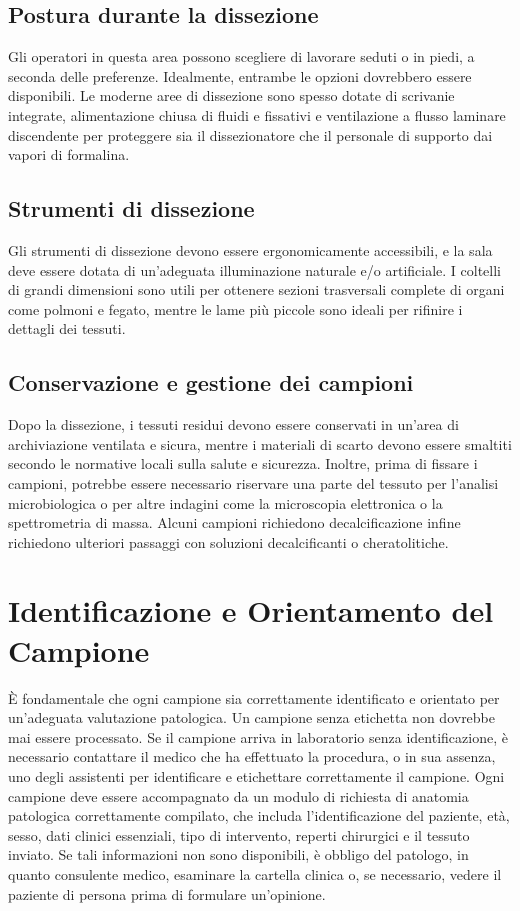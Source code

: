 \subsection{Postura durante la dissezione}
Gli operatori in questa area possono scegliere di lavorare seduti o in piedi, a seconda delle preferenze. Idealmente, entrambe le opzioni dovrebbero essere disponibili. Le moderne aree di dissezione sono spesso dotate di scrivanie integrate, alimentazione chiusa di fluidi e fissativi e ventilazione a flusso laminare discendente per proteggere sia il dissezionatore che il personale di supporto dai vapori di formalina.

\subsection{Strumenti di dissezione}
Gli strumenti di dissezione devono essere ergonomicamente accessibili, e la sala deve essere dotata di un'adeguata illuminazione naturale e/o artificiale. I coltelli di grandi dimensioni sono utili per ottenere sezioni trasversali complete di organi come polmoni e fegato, mentre le lame più piccole sono ideali per rifinire i dettagli dei tessuti.

\subsection{Conservazione e gestione dei campioni}
Dopo la dissezione, i tessuti residui devono essere conservati in un'area di archiviazione ventilata e sicura, mentre i materiali di scarto devono essere smaltiti secondo le normative locali sulla salute e sicurezza. Inoltre, prima di fissare i campioni, potrebbe essere necessario riservare una parte del tessuto per l'analisi microbiologica o per altre indagini come la microscopia elettronica o la spettrometria di massa. Alcuni campioni richiedono decalcificazione infine richiedono ulteriori passaggi con soluzioni decalcificanti o cheratolitiche.

\section{Identificazione e Orientamento del Campione}
È fondamentale che ogni campione sia correttamente identificato e orientato per un'adeguata valutazione patologica. Un campione senza etichetta non dovrebbe mai essere processato. Se il campione arriva in laboratorio senza identificazione, è necessario contattare il medico che ha effettuato la procedura, o in sua assenza, uno degli assistenti per identificare e etichettare correttamente il campione. Ogni campione deve essere accompagnato da un modulo di richiesta di anatomia patologica correttamente compilato, che includa l'identificazione del paziente, età, sesso, dati clinici essenziali, tipo di intervento, reperti chirurgici e il tessuto inviato. Se tali informazioni non sono disponibili, è obbligo del patologo, in quanto consulente medico, esaminare la cartella clinica o, se necessario, vedere il paziente di persona prima di formulare un'opinione.

